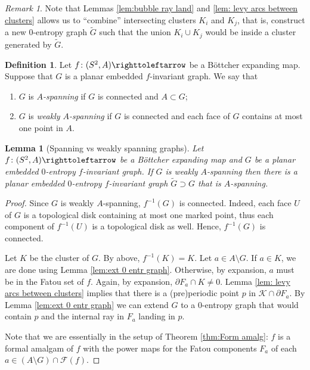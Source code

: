 \documentclass{amsart}
\theoremstyle{plain}
\newtheorem{lemma}[theorem]{Lemma}
\theoremstyle{definition}
\newtheorem{definition}[theorem]{Definition}
\theoremstyle{remark}
\newtheorem{rem}[theorem]{Remark}
\newcommand{\Fat}{{\mathcal F}}
\newcommand{\KC}{{\mathcal K}}
\newcommand\selfmap{\righttoleftarrow}
\begin{document}
\begin{rem}\label{rem:CombinGraphs}
Note that Lemmas \ref{lem:bubble ray land} and  \ref{lem: levy arcs between clusters} allows us to ``combine'' intersecting clusters $K_i$ and $K_j$, that is, construct a new $0$-entropy graph $\widetilde G$ such that the union $K_i\cup K_j$ would be inside a cluster generated by $\widetilde G$.
\end{rem}




\begin{definition}\label{def: weak-span}
Let $f\colon (S^2,A)\selfmap$ be a B\"ottcher expanding map.  Suppose that $G$ is a planar embedded $f$-invariant graph. We say that
\begin{enumerate}
\item $G$ is \emph{$A$-spanning} if $G$ is connected and $A\subset G$;
\item $G$ is \emph{weakly $A$-spanning} if $G$ is connected and each face of $G$ contains at most one point in $A$. 
\end{enumerate}
\end{definition}

\begin{lemma}[Spanning vs weakly spanning graphs]\label{lem: weakly span ext}
Let $f\colon (S^2,A)\selfmap$ be a B\"ottcher expanding map and $G$ be a planar embedded $0$-entropy $f$-invariant graph. If $G$ is weakly $A$-spanning then there is a planar embedded $0$-entropy $f$-invariant graph $\widetilde G\supset G$ that is $A$-spanning. 
\end{lemma}
\begin{proof} 

Since $G$ is weakly $A$-spanning,  $f^{-1}(G)$ is connected. Indeed, each face $U$ of $G$ is a topological disk containing at most one marked point, thus each component of $f^{-1}(U)$ is a topological disk as well. Hence, $f^{-1}(G)$ is connected. 
  
Let $K$ be the cluster of $G$.  By above,  $f^{-1}(K) = K$.  Let $a\in A \setminus G$. If $a\in K$, we are done using Lemma \ref{lem:ext 0 entr graph}.  Otherwise,  by expansion, $a$ must be in the Fatou set of $f$.  Again, by expansion, $\partial F_a\cap K \neq 0$. Lemma \ref{lem: levy arcs between clusters} implies that there is a (pre)periodic point $p$ in $\KC\cap \partial F_a$.  By Lemma \ref{lem:ext 0 entr graph} we can extend $G$ to a $0$-entropy graph that would contain $p$ and the internal ray in $F_a$  landing in $p$. 

Note that we are essentially in the setup of Theorem \ref{thm:Form amalg}: $f$ is a formal amalgam of $f$ with the power maps for the Fatou components $F_a$ of each $a\in (A\setminus G) \cap \Fat(f)$. %
\end{proof}
\end{document}
